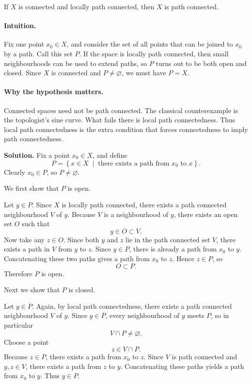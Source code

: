 \documentclass[12pt,a4paper]{article}
\theoremstyle{notespace}
\begin{document}
\medskip

If \(X\) is connected and locally path connected, then \(X\) is path connected.

\paragraph{Intuition.}
Fix one point \(x_0\in X\), and consider the set of all points that can be joined to \(x_0\) by a path. Call this set \(P\). If the space is locally path connected, then small neighbourhoods can be used to extend paths, so \(P\) turns out to be both open and closed. Since \(X\) is connected and \(P\neq \varnothing\), we must have \(P=X\).

\paragraph{Why the hypothesis matters.}
Connected spaces need not be path connected. The classical counterexample is the topologist's sine curve. What fails there is local path connectedness. Thus local path connectedness is the extra condition that forces connectedness to imply path connectedness.

\textbf{Solution.}
Fix a point \(x_0\in X\), and define
\[
P
=
\left\{
x\in X
\;\middle|\;
\text{there exists a path from } x_0 \text{ to } x
\right\}.
\]
Clearly \(x_0\in P\), so \(P\neq \varnothing\).

We first show that \(P\) is open.

Let \(y\in P\). Since \(X\) is locally path connected, there exists a path connected neighbourhood \(V\) of \(y\). Because \(V\) is a neighbourhood of \(y\), there exists an open set \(O\) such that
\[
y\in O\subset V.
\]
Now take any \(z\in O\). Since both \(y\) and \(z\) lie in the path connected set \(V\), there exists a path in \(V\) from \(y\) to \(z\). Since \(y\in P\), there is already a path from \(x_0\) to \(y\). Concatenating these two paths gives a path from \(x_0\) to \(z\). Hence \(z\in P\), so
\[
O\subset P.
\]
Therefore \(P\) is open.

Next we show that \(P\) is closed.

Let \(y\in \overline{P}\). Again, by local path connectedness, there exists a path connected neighbourhood \(V\) of \(y\). Since \(y\in \overline{P}\), every neighbourhood of \(y\) meets \(P\), so in particular
\[
V\cap P\neq \varnothing.
\]
Choose a point
\[
z\in V\cap P.
\]
Because \(z\in P\), there exists a path from \(x_0\) to \(z\). Since \(V\) is path connected and \(y,z\in V\), there exists a path from \(z\) to \(y\). Concatenating these paths yields a path from \(x_0\) to \(y\). Thus \(y\in P\).
\end{document}
